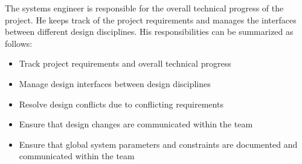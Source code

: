 The systems engineer is responsible for the overall technical progress of the project. He keeps track of the project requirements and manages the interfaces between different design disciplines. His responsibilities can be summarized as follows:

\begin{itemize}
\item Track project requirements and overall technical progress
\item Manage design interfaces between design disciplines
\item Resolve design conflicts due to conflicting requirements
\item Ensure that design changes are communicated within the team
\item Ensure that global system parameters and constraints are documented and communicated within the team
\end{itemize}
